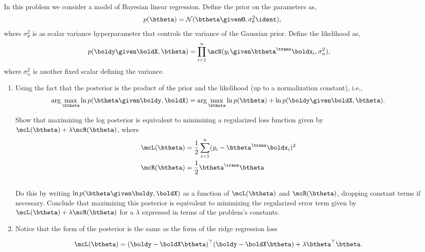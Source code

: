\documentclass[submit]{harvardml}
\begin{document}
\begin{problem}

In this problem we consider a model of Bayesian linear regression. Define the prior on the parameters as,
\begin{align*}
p(\btheta) = \mathcal{N}(\btheta \given \bold0, \sigma^2_\theta\ident ),
\end{align*}
where $\sigma^2_\theta$ is as scalar variance hyperparameter that controls the variance of the Gaussian prior.  Define the likelihood as,
\begin{align*}
p(\boldy \given \boldX, \btheta) &= \prod_{i=1}^n \mcN(y_i \given \btheta^\trans \boldx_i, \sigma^2_n),
\end{align*}
where $\sigma^2_n$ is another fixed scalar defining the variance. \\

\begin{enumerate}
\item Using the fact that the posterior is the product of the prior and the likelihood (up to a normalization constant), i.e., 
\[\arg\max_{\btheta} \ln p(\btheta \given \boldy, \boldX)= \arg\max_{\btheta} \ln p(\btheta) + \ln p(\boldy \given \boldX, \btheta).\]

\noindent Show that maximizing the log posterior is equivalent to minimizing a regularized loss function given by ${\mcL(\btheta) + \lambda \mcR(\btheta)}$, where
\begin{align*}
\mcL(\btheta) &= \frac{1}{2}\sum_{i = 1}^n (y_i - \btheta^\trans \boldx_i)^2 \\
\mcR(\btheta) &= \frac{1}{2}\btheta^\trans \btheta
\end{align*} \\

Do this by writing $\ln p(\btheta \given \boldy, \boldX)$ as a function of $\mcL(\btheta)$ and $\mcR(\btheta)$, dropping constant terms if necessary.  Conclude that maximizing this posterior is equivalent to minimizing the regularized error term given by $\mcL(\btheta) + \lambda \mcR(\btheta)$ for a $\lambda$ expressed in terms of the problem's constants.  

\item Notice that the form of the posterior is the same as the
  form of the ridge regression loss

\[\mcL(\btheta) = (\boldy - \boldX \btheta)^\top (\boldy - \boldX
\btheta) + \lambda \btheta^\top \btheta .\]


\end{enumerate}
\end{problem}
\end{document}
